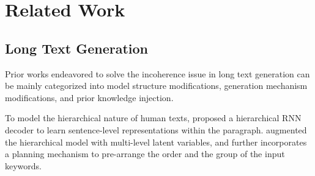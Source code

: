 \documentclass[11pt]{article}
\begin{document}










\section{Related Work}

\subsection{Long Text Generation}
Prior works endeavored to solve the incoherence issue in long text generation can be mainly categorized into model structure modifications, generation mechanism modifications, and prior knowledge injection. 

To model the hierarchical nature of human texts, \citet{JiweiHieRNN} proposed a hierarchical RNN decoder to learn sentence-level representations within the paragraph. \citet{DBLP:conf/acl/ShenCZCWGC19} augmented the hierarchical model with multi-level latent variables, and \citet{DBLP:conf/emnlp/ShaoHWXZ19} further incorporates a planning mechanism to pre-arrange the order and the group of the input keywords. 
\end{document}
